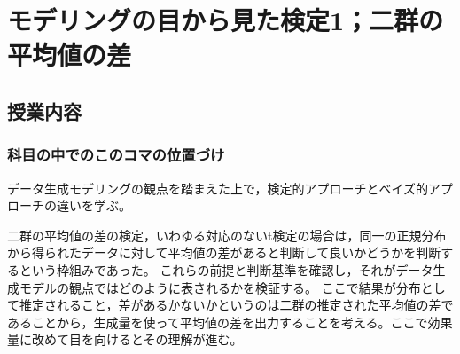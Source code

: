 \section{モデリングの目から見た検定1；二群の平均値の差}
\subsection{授業内容}
\subsubsection{科目の中でのこのコマの位置づけ}
データ生成モデリングの観点を踏まえた上で，検定的アプローチとベイズ的アプローチの違いを学ぶ。

二群の平均値の差の検定，いわゆる対応のないt検定の場合は，同一の正規分布から得られたデータに対して平均値の差があると判断して良いかどうかを判断するという枠組みであった。
これらの前提と判断基準を確認し，それがデータ生成モデルの観点ではどのように表されるかを検証する。
ここで結果が分布として推定されること，差があるかないかというのは二群の推定された平均値の差であることから，生成量を使って平均値の差を出力することを考える。ここで効果量に改めて目を向けるとその理解が進む。

